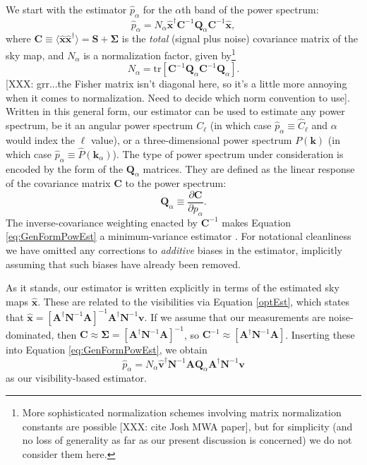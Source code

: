 \documentclass[twocolumn,apj,numberedappendix]{emulateapj}
\newcommand{\vis}{\mathbf{v}}
\newcommand{\x}{\mathbf{x}}
\newcommand{\xhat}{\hat{\mathbf{x}}}
\newcommand{\A}{\mathbf{A}}
\newcommand{\N}{\mathbf{N}}
\begin{document}
We start with the estimator $\hat{p}_\alpha$ for the $\alpha$th band of the power spectrum:
\begin{equation}
\label{eq:GenFormPowEst}
\hat{p}_\alpha = N_\alpha \hat{\x}^\dagger \mathbf{C}^{-1} \mathbf{Q}_\alpha \mathbf{C}^{-1} \hat{\x},
\end{equation}
where $\mathbf{C} \equiv \langle \hat{\x} \hat{\x}^\dagger \rangle = \mathbf{S} + \boldsymbol \Sigma$ is the \emph{total} (signal plus noise) covariance matrix of the sky map, and $N_\alpha$ is a normalization factor, given by\footnote{More sophisticated normalization schemes involving matrix normalization constants are possible [XXX: cite Josh MWA paper], but for simplicity (and no loss of generality as far as our present discussion is concerned) we do not consider them here.}
\begin{equation}
N_\alpha = \textrm{tr} \left[ \mathbf{C}^{-1} \mathbf{Q}_\alpha \mathbf{C}^{-1} \mathbf{Q}_\alpha \right].
\end{equation}
[XXX: grr...the Fisher matrix isn't diagonal here, so it's a little more annoying when it comes to normalization.  Need to decide which norm convention to use].  Written in this general form, our estimator can be used to estimate any power spectrum, be it an angular power spectrum $C_\ell$ (in which case $\hat{p}_\alpha \equiv \hat{C}_\ell$ and $\alpha$ would index the $\ell$ value), or a three-dimensional power spectrum $P(\mathbf{k} )$ (in which case $\hat{p}_\alpha \equiv \hat{P}(\mathbf{k}_\alpha)$).  The type of power spectrum under consideration is encoded by the form of the $\mathbf{Q}_\alpha$ matrices.  They are defined as the linear response of the covariance matrix $\mathbf{C}$ to the power spectrum:
\begin{equation}
\mathbf{Q}_\alpha \equiv \frac{\partial \mathbf{C}}{\partial p_\alpha}.
\end{equation}
The inverse-covariance weighting enacted by $\mathbf{C}^{-1}$ makes Equation \eqref{eq:GenFormPowEst} a minimum-variance estimator \citep{liu_tegmark2011}.  For notational cleanliness we have omitted any corrections to \emph{additive} biases in the estimator, implicitly assuming that such biases have already been removed.

As it stands, our estimator is written explicitly in terms of the estimated sky maps $\hat{\x}$.  These are related to the visibilities via Equation \eqref{optEst}, which states that $\xhat = \left[ \A^\dagger \N^{-1} \A \right]^{-1} \A^\dagger \N^{-1} \vis$.  If we assume that our measurements are noise-dominated, then $\mathbf{C} \approx \boldsymbol \Sigma = [ \mathbf{A}^\dagger \mathbf{N}^{-1} \mathbf{A} ]^{-1}$, so $\mathbf{C}^{-1} \approx [ \mathbf{A}^\dagger \mathbf{N}^{-1} \mathbf{A} ]$.  Inserting these into Equation \eqref{eq:GenFormPowEst}, we obtain
\begin{equation}
\label{eq:VisBasedPowEst}
\hat{p}_\alpha = N_\alpha \hat{\vis}^\dagger \N^{-1} \A  \mathbf{Q}_\alpha \A^\dagger \N^{-1} \vis
\end{equation}
as our visibility-based estimator.
\end{document}
